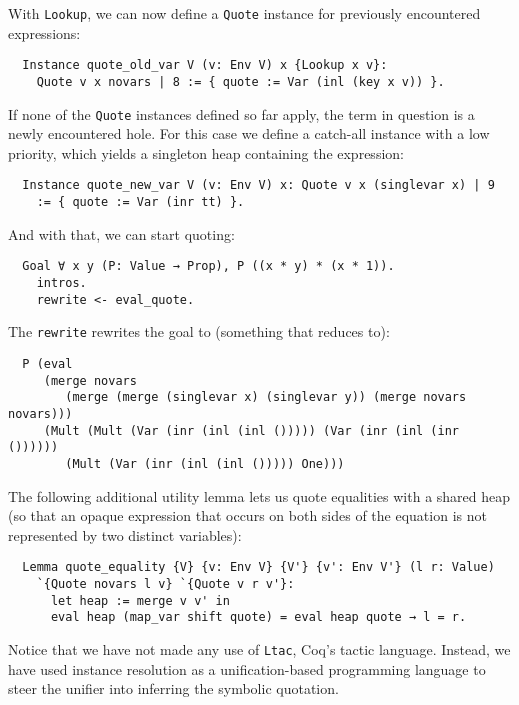 \documentclass[a4paper,10pt,runningheads]{llncs}
\begin{document}
With \lstinline|Lookup|, we can now define a \lstinline|Quote| instance for previously encountered expressions:
\begin{lstlisting}
  Instance quote_old_var V (v: Env V) x {Lookup x v}:
    Quote v x novars | 8 := { quote := Var (inl (key x v)) }.
\end{lstlisting}

If none of the \lstinline|Quote| instances defined so far apply, the term in question is a newly encountered hole. For this case we define a catch-all instance with a low priority, which yields a singleton heap containing the expression:
\begin{lstlisting}
  Instance quote_new_var V (v: Env V) x: Quote v x (singlevar x) | 9
    := { quote := Var (inr tt) }.
\end{lstlisting}
And with that, we can start quoting:
\begin{lstlisting}
  Goal ∀ x y (P: Value → Prop), P ((x * y) * (x * 1)).
    intros.
    rewrite <- eval_quote.
\end{lstlisting}
The \lstinline|rewrite| rewrites the goal to (something that reduces to):
\begin{lstlisting}
  P (eval
     (merge novars
        (merge (merge (singlevar x) (singlevar y)) (merge novars novars)))
     (Mult (Mult (Var (inr (inl (inl ())))) (Var (inr (inl (inr ())))))
        (Mult (Var (inr (inl (inl ())))) One)))
\end{lstlisting}

The following additional utility lemma lets us quote equalities with a shared heap (so that an opaque expression that occurs on both sides of the equation is not represented by two distinct variables):
\begin{lstlisting}
  Lemma quote_equality {V} {v: Env V} {V'} {v': Env V'} (l r: Value)
    `{Quote novars l v} `{Quote v r v'}:
      let heap := merge v v' in
      eval heap (map_var shift quote) = eval heap quote → l = r.
\end{lstlisting}

Notice that we have not made any use of \lstinline|Ltac|, Coq's tactic language. Instead, we have used instance resolution as a unification-based programming language to steer the unifier into inferring the symbolic quotation.

\end{document}
